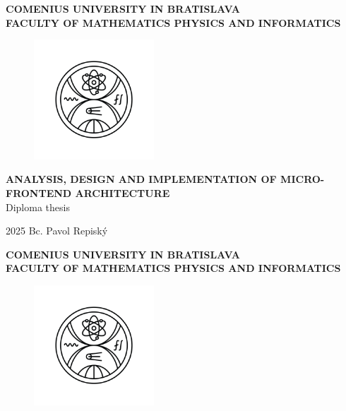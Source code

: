 \documentclass[12pt, oneside]{book}  %
\def\mfrok{2025}
\def\mftitle{Analysis, Design and Implementation of Micro-frontend Architecture}
\def\mfauthor{Bc. Pavol Repiský}
\def\mfuniverzita{COMENIUS UNIVERSITY IN BRATISLAVA}
\def\mffakulta{FACULTY OF MATHEMATICS PHYSICS AND INFORMATICS}
\def\mftypprace{Diploma thesis}
\begin{document}
     
\frontmatter
\pagestyle{empty}

\noindent
\begin{minipage}{\textwidth}
    \begin{center}
      \textbf{\mfuniverzita\\
      \mffakulta}
    \end{center}
\end{minipage}

\vfill
\begin{figure}[!hbt]
	\begin{center}
		\includegraphics[width=0.4\textwidth]{images/FMFI_logo_BP.png}
		\label{img:logo}
	\end{center}
\end{figure}
\begin{center}
		\textbf{\MakeUppercase{\Large\mftitle}}\\
    \mftypprace
\end{center}
\vfill
\mfrok \hfill
\mfauthor
\cleardoublepage


\thispagestyle{empty}
\noindent
\begin{minipage}{\textwidth}
    \begin{center}
      \textbf{\mfuniverzita\\
      \mffakulta}
    \end{center}
\end{minipage}

\vfill
\begin{figure}[!hbt]
    \begin{center}
        \includegraphics[width=0.4\textwidth]{images/FMFI_logo_BP.png}
        \label{img:logo_dark}
    \end{center}
\end{figure}
\end{document}
